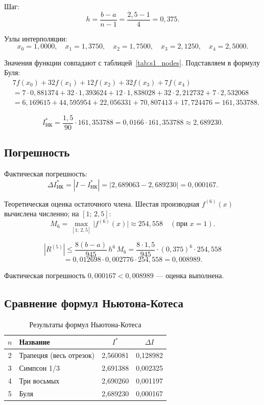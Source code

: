 \documentclass[a4paper, final]{article}
\begin{document}
Шаг:
\[
h = \frac{b-a}{n-1} = \frac{2{,}5-1}{4} = 0{,}375.
\]

Узлы интерполяции:
\[
x_0 = 1{,}0000,\quad x_1 = 1{,}3750,\quad x_2 = 1{,}7500,
\quad x_3 = 2{,}1250,\quad x_4 = 2{,}5000.
\]

Значения функции совпадают с таблицей~\ref{tab:s1_nodes}. Подставляем в формулу Буля:
\begin{align*}
&7f(x_0)+32f(x_1)+12f(x_2)+32f(x_3)+7f(x_4)\\
&= 7\cdot0{,}881374 + 32\cdot1{,}393624 + 12\cdot1{,}838028
   + 32\cdot2{,}212732 + 7\cdot2{,}532068\\
&= 6{,}169615 + 44{,}595954 + 22{,}056331 + 70{,}807413 + 17{,}724476
 = 161{,}353788.
\end{align*}

\[
\boxed{I^*_\text{НК} = \frac{1{,}5}{90}\cdot 161{,}353788
= 0{,}016\overline{6}\cdot 161{,}353788 \approx 2{,}689230.}
\]

\subsection{Погрешность}

Фактическая погрешность:
\[
\Delta I^*_\text{НК} = |I - I^*_\text{НК}| = |2{,}689063 - 2{,}689230| = 0{,}000167.
\]

Теоретическая оценка остаточного члена. Шестая производная $f^{(6)}(x)$
вычислена численно; на $[1;\,2{,}5]$:
\[
M_6 = \max_{[1;\,2{,}5]}\bigl|f^{(6)}(x)\bigr| \approx 254{,}558 \quad (\text{при }x=1).
\]

\[
|R^{(5)}| \leq \frac{8(b-a)}{945}\,h^6\,M_6
= \frac{8\cdot 1{,}5}{945}\cdot(0{,}375)^6\cdot 254{,}558\]
\[= 0{,}012698\cdot 0{,}002776\cdot 254{,}558 = 0{,}008989.
\]

Фактическая погрешность $0{,}000167 < 0{,}008989$ --- оценка выполнена.

\subsection{Сравнение формул Ньютона-Котеса}

\begin{table}[h!]
\centering
\caption{Результаты формул Ньютона-Котеса}
\label{tab:nc_comp}
\begin{tabular}{|c|l|c|c|}
\hline
$n$ & Название & $I^*$ & $\Delta I$ \\
\hline
2 & Трапеция (весь отрезок) & 2,560081 & 0,128982 \\
3 & Симпсон 1/3              & 2,691388 & 0,002325 \\
4 & Три восьмых              & 2,690260 & 0,001197 \\
5 & Буля                     & 2,689230 & 0,000167 \\
\hline
\end{tabular}
\end{table}
\end{document}
